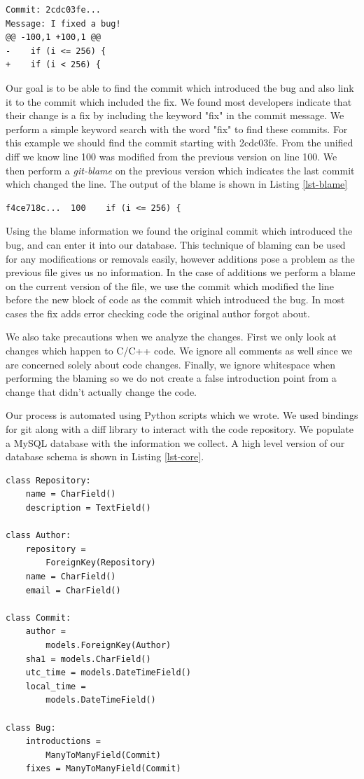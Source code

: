 \documentclass[preprint, 11pt]{sigplanconf}
\begin{document}
\begin{lstlisting}[caption=An example bug fix,label=lst-fix,frame=single]
Commit: 2cdc03fe...
Message: I fixed a bug!
@@ -100,1 +100,1 @@
-    if (i <= 256) {
+    if (i < 256) {
\end{lstlisting}

Our goal is to be able to find the commit which introduced the bug and
also link it to the commit which included the fix. We found most
developers indicate that their change is a fix by including the keyword "fix"
in the commit message. We perform a simple keyword search with the word "fix"
to find these commits. For this example we should find the commit
starting with 2cdc03fe. From the unified diff we know line 100 was
modified from the previous version on line 100. We then perform a {\em
  git-blame} on the previous version which indicates the last commit
which changed the line. The output of the blame is shown in Listing
\ref{lst-blame}

\begin{lstlisting}[caption=Blame of the previous version,label=lst-blame,frame=single]
f4ce718c...  100    if (i <= 256) {
\end{lstlisting}

Using the blame information we found the original commit which
introduced the bug, and can enter it into our database. This
technique of blaming can be used for any modifications or removals
easily, however additions pose a problem as the previous file gives us
no information. In the case of additions we perform a blame on the
current version of the file, we use the commit which modified the line
before the new block of code as the commit which introduced the
bug. In most cases the fix adds error checking code the original
author forgot about.

We also take precautions when we analyze the changes. First we only
look at changes which happen to C/C++ code. We ignore all comments as
well since we are concerned solely about code changes. Finally, we
ignore whitespace when performing the blaming so we do not create a
false introduction point from a change that didn't actually change the
code.

Our process is automated using Python scripts which we wrote. We used
bindings for git along with a diff library to interact with the code
repository. We populate a MySQL database with the information we
collect. A high level version of our database schema is shown in
Listing \ref{lst-core}.

\begin{lstlisting}[caption=Core database schema,label=lst-core,frame=single]
class Repository:
    name = CharField()
    description = TextField()

class Author:
    repository = 
        ForeignKey(Repository)
    name = CharField()
    email = CharField()

class Commit:
    author =
        models.ForeignKey(Author)
    sha1 = models.CharField()
    utc_time = models.DateTimeField()
    local_time =
        models.DateTimeField()

class Bug:
    introductions =
        ManyToManyField(Commit)
    fixes = ManyToManyField(Commit)    
\end{lstlisting}
\end{document}
